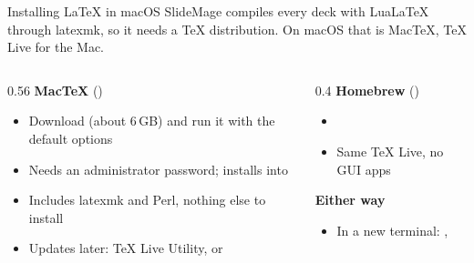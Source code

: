 
\begin{standardframe}{Installing LaTeX in macOS}
	\small
	SlideMage compiles every deck with LuaLaTeX through latexmk, so it needs a
	TeX distribution. On macOS that is MacTeX, TeX Live for the Mac.
	\par\medskip
	\begin{columns}[T,onlytextwidth]
		\begin{column}{0.56\linewidth}
			\textbf{MacTeX} ()
			\begin{itemize}
				\item Download  (about 6\,GB) and run it with the default options
				\item Needs an administrator password; installs into 
				\item Includes latexmk and Perl, nothing else to install
				\item Updates later: TeX Live Utility, or 
			\end{itemize}
		\end{column}
		\begin{column}{0.4\linewidth}
			\textbf{Homebrew} ()
			\begin{itemize}
				\item {}
				\item Same TeX Live, no GUI apps
			\end{itemize}
			\medskip
			\textbf{Either way}
			\begin{itemize}
				\item In a new terminal: , 
			\end{itemize}
		\end{column}
	\end{columns}
\end{standardframe}
